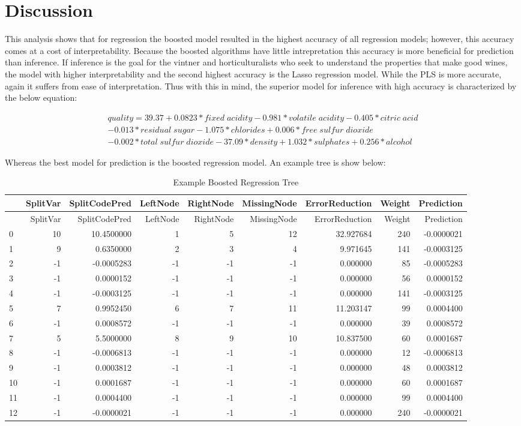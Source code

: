 \documentclass[]{article}
\begin{document}
\section{Discussion}\label{discussion}

This analysis shows that for regression the boosted model resulted in
the highest accuracy of all regression models; however, this accuracy
comes at a cost of interpretability. Because the boosted algorithms have
little intrepretation this accuracy is more beneficial for prediction
than inference. If inference is the goal for the vintner and
horticulturalists who seek to understand the properties that make good
wines, the model with higher interpretability and the second highest
accuracy is the Lasso regression model. While the PLS is more accurate,
again it suffers from ease of interpretation. Thus with this in mind,
the superior model for inference with high accuracy is characterized by
the below equation:

\begin{equation}
\begin{aligned}
\label{lasso_eq}
quality = 39.37 + 0.0823 * fixed\;acidity -0.981 * volatile\;acidity -0.405 * citric\;acid \\
-0.013 *residual\;sugar -1.075 * chlorides + 0.006 * free\;sulfur\;dioxide\\
- 0.002 * total\;sulfur\;dioxide - 37.09 * density +1.032 * sulphates + 0.256 * alcohol
\end{aligned}
\end{equation}

Whereas the best model for prediction is the boosted regression model.
An example tree is show below:

\begin{longtable}[]{@{}lrrrrrrrr@{}}
\caption{Example Boosted Regression Tree}\tabularnewline
\toprule
& SplitVar & SplitCodePred & LeftNode & RightNode & MissingNode &
ErrorReduction & Weight & Prediction\tabularnewline
\midrule
\endfirsthead
\toprule
& SplitVar & SplitCodePred & LeftNode & RightNode & MissingNode &
ErrorReduction & Weight & Prediction\tabularnewline
\midrule
\endhead
0 & 10 & 10.4500000 & 1 & 5 & 12 & 32.927684 & 240 &
-0.0000021\tabularnewline
1 & 9 & 0.6350000 & 2 & 3 & 4 & 9.971645 & 141 &
-0.0003125\tabularnewline
2 & -1 & -0.0005283 & -1 & -1 & -1 & 0.000000 & 85 &
-0.0005283\tabularnewline
3 & -1 & 0.0000152 & -1 & -1 & -1 & 0.000000 & 56 &
0.0000152\tabularnewline
4 & -1 & -0.0003125 & -1 & -1 & -1 & 0.000000 & 141 &
-0.0003125\tabularnewline
5 & 7 & 0.9952450 & 6 & 7 & 11 & 11.203147 & 99 &
0.0004400\tabularnewline
6 & -1 & 0.0008572 & -1 & -1 & -1 & 0.000000 & 39 &
0.0008572\tabularnewline
7 & 5 & 5.5000000 & 8 & 9 & 10 & 10.837500 & 60 &
0.0001687\tabularnewline
8 & -1 & -0.0006813 & -1 & -1 & -1 & 0.000000 & 12 &
-0.0006813\tabularnewline
9 & -1 & 0.0003812 & -1 & -1 & -1 & 0.000000 & 48 &
0.0003812\tabularnewline
10 & -1 & 0.0001687 & -1 & -1 & -1 & 0.000000 & 60 &
0.0001687\tabularnewline
11 & -1 & 0.0004400 & -1 & -1 & -1 & 0.000000 & 99 &
0.0004400\tabularnewline
12 & -1 & -0.0000021 & -1 & -1 & -1 & 0.000000 & 240 &
-0.0000021\tabularnewline
\bottomrule
\end{longtable}
\end{document}
